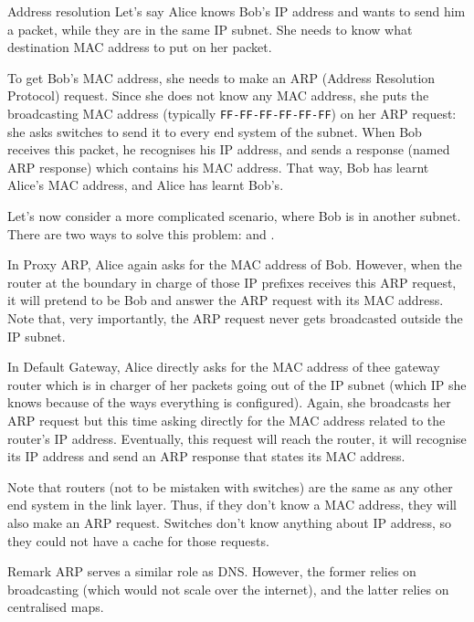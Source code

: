 \documentclass[a4paper]{article}
\begin{document}
\begin{parag}{Address resolution}
    Let's say Alice knows Bob's IP address and wants to send him a packet, while they are in the same IP subnet. She needs to know what destination MAC address to put on her packet. 

    To get Bob's MAC address, she needs to make an ARP (Address Resolution Protocol) request. Since she does not know any MAC address, she puts the broadcasting MAC address (typically \texttt{FF-FF-FF-FF-FF-FF}) on her ARP request: she asks switches to send it to every end system of the subnet. When Bob receives this packet, he recognises his IP address, and sends a response (named ARP response) which contains his MAC address. That way, Bob has learnt Alice's MAC address, and Alice has learnt Bob's. 

    Let's now consider a more complicated scenario, where Bob is in another subnet. There are two ways to solve this problem:  and .

    In Proxy ARP, Alice again asks for the MAC address of Bob. However, when the router at the boundary in charge of those IP prefixes receives this ARP request, it will pretend to be Bob and answer the ARP request with its MAC address. Note that, very importantly, the ARP request never gets broadcasted outside the IP subnet.

    In Default Gateway, Alice directly asks for the MAC address of thee gateway router which is  in charger of her packets going out of the IP subnet (which IP she knows because of the ways everything is configured). Again, she broadcasts her ARP request but this time asking directly for the MAC address related to the router's IP address. Eventually, this request will reach the router, it will recognise its IP address and send an ARP response that states its MAC address.

    Note that routers (not to be mistaken with switches) are the same as any other end system in the link layer. Thus, if they don't know a MAC address, they will also make an ARP request. Switches don't know anything about IP address, so they could not have a cache for those requests.

    \begin{subparag}{Remark}
        ARP serves a similar role as DNS. However, the former relies on broadcasting (which would not scale over the internet), and the latter relies on centralised maps.
    \end{subparag}
\end{parag}
\end{document}
